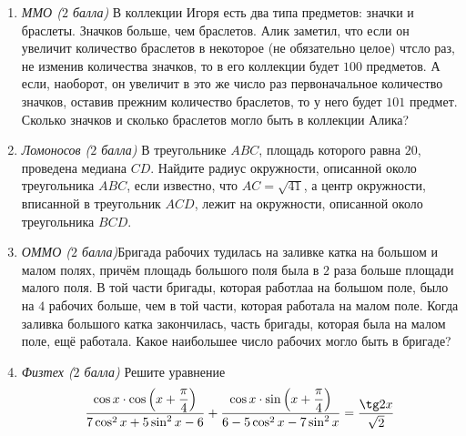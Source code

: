 \begin{enumerate}
    \item \textit{ММО ($2$ балла)} В коллекции Игоря есть два типа предметов: значки и браслеты. Значков больше, чем браслетов. Алик заметил, что если он увеличит количество браслетов в некоторое (не обязательно целое) чтсло раз, не изменив количества значков, то в его коллекции будет $100$ предметов. А если, наоборот, он увеличит в это же число раз первоначальное количество значков, оставив прежним количество браслетов, то у него будет $101$ предмет. Сколько значков и сколько браслетов могло быть в коллекции Алика?
    \item \textit{Ломоносов ($2$ балла)} В треугольнике $ABC$, площадь которого равна $20$, проведена медиана $CD$. Найдите радиус окружности, описанной около треугольника $ABC$, если известно, что $AC=\sqrt{41}$, а центр окружности, вписанной в треугольник $ACD$, лежит на окружности, описанной около треугольника $BCD$.
    \item \textit{ОММО ($2$ балла)}Бригада рабочих тудилась на заливке катка на большом и малом полях, причём площадь большого поля была в $2$ раза больше площади малого поля. В той части бригады, которая работлаа на большом поле, было на $4$ рабочих больше, чем в той части, которая работала на малом поле. Когда заливка большого катка закончилась, часть бригады, которая была на малом поле, ещё работала. Какое наибольшее число рабочих могло быть в бригаде?
    \item \textit{Физтех ($2$ балла)} Решите уравнение \[\frac{\cos x\cdot\cos \left(x+\dfrac{\pi}{4}\right)}{7\cos^2x+5\sin^2x-6}+\frac{\cos x\cdot\sin\left(x+\dfrac{\pi}{4}\right)}{6-5\cos^2x-7\sin^2x}=\frac{\tg 2x}{\sqrt{2}}\]
\end{enumerate}
